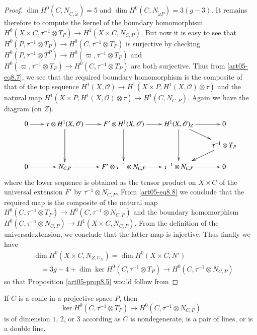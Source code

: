 \begin{proof}
$\dim H^{0}(C,N_{C,\widetilde{\omega}})=5$ and $\dim
H^{0}(C,N_{\widetilde{\omega}P})=3(g-3)$. It remains therefore to
compute the kernel of the boundary homomorphism $H^{0}(X\times
C,\tau^{-1}\otimes T_{P})\to H^{1}(X\times C,N_{C,P})$. But now it is
easy to see that $H^{0}(P,\tau^{-1}\otimes T_{P})\to
H^{0}(C,\tau^{-1}\otimes T_{P})$ is surjective by checking
$H^{0}(P,\tau^{-1}\otimes T^{P})\to
H^{0}(\varpi,\tau^{-1}\otimes T_{P})$ and
$H^{0}(\varpi,\tau^{-1}\otimes T_{P})\to
H^{0}(C,\tau^{-1}\otimes T_{P})$ are both surjective. Thus from 
\eqref{art05-eq8.7}, we see that the required boundary homomorphism is
the composite of that of the top sequence $H^{1}(X,\mathscr{O})\to
H^{1}(X\times P,H^{1}(X,\mathscr{O})\otimes \tau)$ and the natural map
$H^{1}(X\times P, H^{1}(X,\mathscr{O})\otimes \tau)\to
H^{1}(C,N_{C,P})$. Again we have the diagram (on $Z$).
{\fontsize{9pt}{11pt}\selectfont
\begin{equation}
\vcenter{
\xymatrix@C=.7cm@R=.5cm{
0\ar[r] & \tau\otimes H^{1}(X,\mathscr{O})\ar[r]\ar[dd] & F'\otimes
H^{1}(X,\mathscr{O})\ar[r]\ar[dd] &
H^{1}(X,\mathscr{O})_{Z}\ar[r]\ar[dd]\ar[dr] & 0\\
 & & & & \tau^{-1}\otimes T_{P}\ar[dl]\\
0\ar[r] & N_{C,P}\ar[r] & F'\otimes \tau^{-1}\otimes N_{C,P}\ar[r]
& \tau^{-1}\otimes N_{C,P}\ar[r] & 0
}}\label{art05-eq8.8}
\end{equation}}
where the lower sequence is obtained as the tensor product on $X\times
C$ of the universal extension $F'$ by $\tau^{-1}\otimes N_{C,P}$. From 
\eqref{art05-eq8.8} we conclude that the required map is the composite
of the natural map $H^{0}(C,\tau^{-1}\otimes T_{P})\to
H^{0}(C,\tau^{-1}\otimes N_{C,P})$ and the boundary homomorphism
$H^{0}(C,\tau^{-1}\otimes N_{C,P})\to H^{1}(X\times C,N_{C,P})$. From
the definition of the universal\pageoriginale extension, we conclude
that the latter map is injective. Thus finally we have
\begin{align*}
& \dim H^{0}(X\times C,N_{Z,U_{X}})=\dim H^{0}(X\times C,N')\\
&\quad =3g-4+\dim \ker H^{0}(C,\tau^{-1}\otimes T_{P})\to
H^{0}(C,\tau^{-1}\otimes N_{C,P})
\end{align*}
so that Proposition \ref{art05-prop8.5} would follow from
\end{proof}

\setcounter{theorem}{8}
\begin{lemma}\label{art05-lem8.9}
If $C$ is a conic in a projective space $P$, then 
$$
\ker
H^{0}(C,\tau^{-1}\otimes T_{P})\to H^{0}(C,\tau^{-1}\otimes N_{C,P})
$$
is of dimension $1$, $2$, or $3$ according as $C$ is nondegenerate, is
a pair of lines, or is a double line.
\end{lemma}

